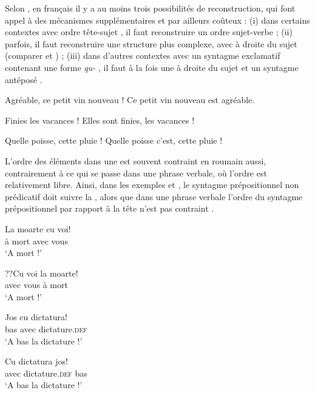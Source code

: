 
Selon \citet{GGFToAppear}, en français il y a au moins trois possibilités de reconstruction, qui font appel à des mécanismes supplémentaires et par ailleurs coûteux : (i) dans certains contextes avec ordre tête-sujet , il faut reconstruire un ordre sujet-verbe  ; (ii) parfois, il faut reconstruire une structure plus complexe, avec  à droite du sujet (comparer  et ) ; (iii) dans d’autres contextes avec un syntagme exclamatif contenant une forme \textit{qu-} , il faut à la fois une  à droite du sujet et un syntagme antéposé .

\ea
\ea  Agréable, ce petit vin nouveau !  \label{ch1:ex30a}
\ex  Ce petit vin nouveau est agréable. \label{ch1:ex30b}
\z
\z

\ea
\ea  Finies les vacances ! \label{ch1:ex31a} 
\ex  Elles sont finies, les vacances ! \label{ch1:ex31b}
\z
\z

\ea
\ea  Quelle poisse, cette pluie ! \label{ch1:ex32a} 
\ex  Quelle poisse c’est, cette pluie ! \label{ch1:ex32b}
\z
\z

L’ordre des éléments dans une  est souvent contraint en rou\-main aussi, contrairement à ce qui se passe dans une phrase verbale, où l’ordre est relativement libre. Ainsi, dans les exemples  et , le syntagme prépositionnel non prédicatif doit suivre la , alors que dans une phrase verbale l’ordre du syntagme prépositionnel par rapport à la tête n’est pas contraint .

\ea \label{ch1:ex33}
\ea
\gll   La  moarte  cu  voi!\\
à  mort  avec  vous\\
\glt ‘A mort !’ 

\ex 
\gll  ??Cu  voi  la  moarte!\\
  avec  vous  à  mort\\
\glt ‘A mort !’ 
\z
\z


\ea \label{ch1:ex34}
\ea
\gll  Jos  cu  dictatura!\\
bas  avec  dictature\textsc{.def}\\
\glt ‘A bas la dictature !’ 

\ex
\gll   *Cu  dictatura  jos!\\
  avec  dictature\textsc{.def}  bas\\
\glt ‘A bas la dictature !’ 
\z
\z


